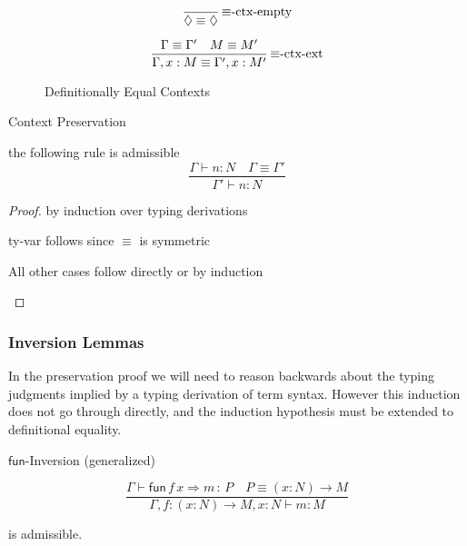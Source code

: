 \begin{figure}
\[
\frac{\ }{\lozenge\equiv\lozenge}\,\textrm{\ensuremath{\equiv}-ctx-empty}
\]

\[
\frac{\Gamma\equiv\Gamma'\quad M\equiv M'}{\Gamma,x:M\equiv\Gamma',x:M'}\,\textrm{\ensuremath{\equiv}-ctx-ext}
\]

\caption{Definitionally Equal Contexts}
\label{fig:surface-Context-Equiv}
\end{figure}

\begin{lem}
Context Preservation

the following rule is admissible
\[
\frac{\Gamma\vdash n:N\quad\Gamma\equiv\Gamma'}{\Gamma'\vdash n:N}
\]
\end{lem}

\begin{proof}
by induction over typing derivations

\begin{casenv}
  \item \textrm{ty-var} follows since $\equiv$ is symmetric
  \item All other cases follow directly or by induction
\end{casenv}
\end{proof}

\subsubsection{Inversion Lemmas}
In the preservation proof we will need to reason backwards about the typing judgments implied by a typing derivation of term syntax.
However this induction does not go through directly, and the induction hypothesis must be extended to definitional equality.

\begin{lem}
$\mathsf{fun}$-Inversion (generalized)

\[
\frac{\Gamma\vdash\mathsf{fun}\,f\,x\Rightarrow m\,:\,P\quad P\equiv\left(x:N\right)\rightarrow M}{\Gamma,f:\left(x:N\right)\rightarrow M,x:N\vdash m:M}
\]

is admissible. 
\end{lem}

